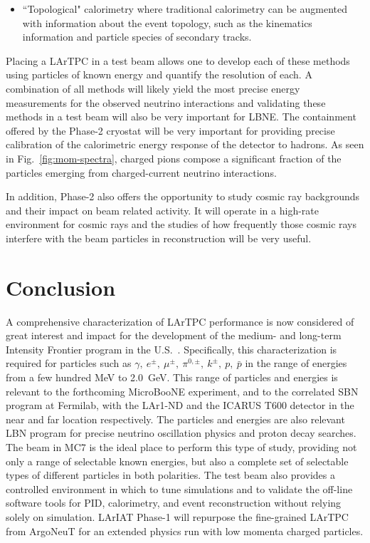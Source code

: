 \documentclass[DIV=calc, paper=a4, fontsize=10pt, twocolumn]{scrartcl}	 %
\begin{document}
{\begin{itemize}
\item ``Topological" calorimetry where traditional calorimetry can be augmented with information about the event topology, such as the kinematics information and particle species of secondary tracks. 
\end{itemize}
Placing a LArTPC in a test beam allows one to develop each of these methods using particles of known energy and quantify the resolution of each.  A combination of all methods will likely yield the most precise energy measurements for the observed neutrino interactions and validating these methods in a test beam will also be very important for LBNE.  The containment offered by the Phase-2 cryostat will be very important for providing precise calibration of the calorimetric energy response of the detector to hadrons.  As seen in Fig.~\ref{fig:mom-spectra}, charged pions compose a significant fraction of the particles emerging from charged-current neutrino interactions. 

In addition, Phase-2 also offers the opportunity to study cosmic ray backgrounds and their impact on beam related activity.  It will operate in a high-rate environment for cosmic rays and the studies of how frequently those cosmic rays interfere with the beam particles in reconstruction will be very useful. 

\section{Conclusion}

A comprehensive characterization of LArTPC performance is now considered of great interest and impact for the development of the medium- and long-term Intensity Frontier program in the U.S.~\cite{LArTPC-R&D}.  Specifically, this characterization is required for particles such as $\gamma,~e^\pm,~\mu^\pm,~\pi^{0,\pm},~k^\pm,~p,~\bar p$ in the range of energies from a few hundred MeV to 2.0~GeV.  This range of particles and energies is relevant to the forthcoming MicroBooNE experiment, and to the correlated SBN program at Fermilab, with the LAr1-ND and the ICARUS T600 detector in the near and far location respectively.  The particles and energies are also relevant LBN program for precise neutrino oscillation physics and proton decay searches.  The beam in MC7 is the ideal place to perform this type of study, providing not only a range of selectable known energies, but also a complete set of selectable types of different particles in both polarities.  The test beam also provides a controlled environment in which to tune simulations and to validate the off-line software tools for PID, calorimetry, and event reconstruction without relying solely on simulation. {\sf LArIAT} Phase-1 will repurpose the fine-grained LArTPC from ArgoNeuT for an extended physics run with low momenta charged particles.

}
\end{document}
